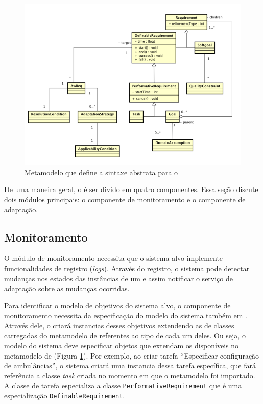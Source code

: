 \begin{figure}[h]
	\centering
	\includegraphics[width=1\textwidth]{figuras/metamodelos/metamodelo-zanshin-antigo.png}
	\caption{Metamodelo que define a sintaxe abstrata para o \zanshin}
	\label{figura-metamodelo-antigo}
\end{figure}

De uma maneira geral, o \zanshin é ser divido em quatro componentes. Essa seção discute dois módulos principais: o componente de monitoramento e o componente de adaptação.

\subsection{Monitoramento}
\label{sec-referencial-zanshin-monitoramento}

O módulo de monitoramento necessita que o sistema alvo implemente funcionalidades de registro (\textit{logs}). Através do registro, o sistema pode detectar mudanças nos estados das instâncias de um \awreq e assim notificar o serviço de adaptação sobre as mudanças ocorridas. 

Para identificar o modelo de objetivos do sistema alvo, o componente de monitoramento necessita da especificação do modelo do sistema também em \emf. Através dele, o \zanshin criará instancias desses objetivos extendendo as de classes carregadas do metamodelo de \gore referentes ao tipo de cada um deles. Ou seja, o modelo do sistema deve especificar objetos que extendam os disponíveis no metamodelo de \gore (Figura \ref{figura-metamodelo-antigo}). Por exemplo, ao criar tarefa ``Especificar configuração de ambulâncias'', o sistema criará uma instancia dessa tarefa específica, que fará referência a classe \textit{task} criada no momento em que o metamodelo foi importado. A classe de tarefa especializa a classe \texttt{PerformativeRequirement} que é uma especialização \texttt{DefinableRequirement}. 

